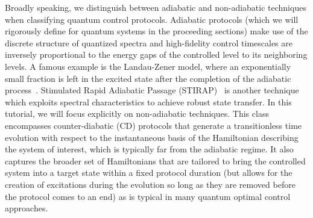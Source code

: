 Broadly speaking, we distinguish between adiabatic and non-adiabatic techniques when classifying quantum control protocols. Adiabatic protocols (which we will rigorously define for quantum systems in the proceeding sections) make use of the discrete structure of quantized spectra and high-fidelity control timescales are inversely proportional to the energy gaps of the controlled level to its neighboring levels. A famous example is the Landau-Zener model, where an exponentially small fraction is left in the excited state after the completion of the adiabatic process~\cite{LZreview}. Stimulated Rapid Adiabatic Passage (STIRAP)~\cite{STIRAPreview} is another technique which exploits spectral characteristics to achieve robust state transfer. In this tutorial, we will focus explicitly on non-adiabatic techniques. This class encompasses counter-diabatic (CD) protocols that generate a transitionless time evolution with respect to the instantaneous basis of the Hamiltonian describing the system of interest, which is typically far from the adiabatic regime. It also captures the broader set of Hamiltonians that are tailored to bring the controlled system into a target state within a fixed protocol duration (but allows for the creation of excitations during the evolution so long as they are removed before the protocol comes to an end) as is typical in many quantum optimal control approaches.\\



